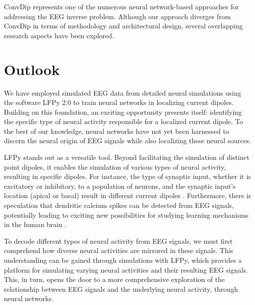 \documentclass[a4paper, UKenglish, 11pt]{uiomaster}
\begin{document}
ConvDip represents one of the numerous neural network-based approaches for addressing the EEG inverse problem. Although our approach diverges from ConvDip in terms of methodology and architectural design, several overlapping research aspects have been explored.


\section{Outlook} \label{sec:outlook}
We have employed simulated EEG data from detailed neural simulations using the software LFPy 2.0 to train neural networks in localizing current dipoles. Building on this foundation, an exciting opportunity presents itself: identifying the specific type of neural activity responsible for a localized current dipole. To the best of our knowledge, neural networks have not yet been harnessed to discern the neural origin of EEG signals while also localizing these neural sources.

LFPy stands out as a versatile tool. Beyond facilitating the simulation of distinct point dipoles, it enables the simulation of various types of neural activity, resulting in specific dipoles. For instance, the type of synaptic input, whether it is excitatory or inhibitory, to a population of neurons, and the synaptic input's location (apical or basal) result in different current dipoles \cite{LFPy}.  Furthermore, there is speculation that dendritic calcium spikes can be detected from EEG signals, potentially leading to exciting new possibilities for studying learning mechanisms in the human brain \cite{suzuki2017dendritic}.

To decode different types of neural activity from EEG signals, we must first comprehend how diverse neural activities are mirrored in these signals. This understanding can be gained through simulations with LFPy, which provides a platform for simulating varying neural activities and their resulting EEG signals. This, in turn, opens the door to a more comprehensive exploration of the relationship between EEG signals and the underlying neural activity, through neural networks.




\end{document}
